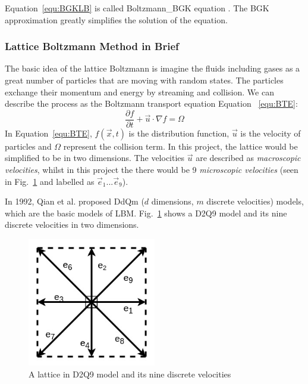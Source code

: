 Equation~\ref{equ:BGKLB} is called Boltzmann\_BGK equation \cite{chew1956boltzmann}. The BGK approximation greatly simplifies the solution of the equation.

\subsubsection{Lattice Boltzmann Method in Brief} \label{sec:lbmb}
The basic idea of the lattice Boltzmann is imagine the fluids including gases as a great number of particles that are moving with random states. The particles exchange their momentum and energy by streaming and collision. We can describe the process as the Boltzmann transport equation Equation ~\ref{equ:BTE}:
\begin{equation}
\label{equ:BTE}
    \frac{\partial f}{\partial t} + \vec{u}\cdot \nabla f = \Omega
\end{equation}
In Equation~\ref{equ:BTE}, $f(\vec{x}, t)$ is the distribution function, $\vec{u}$ is the velocity of particles and $\Omega$ represent the collision term. In this project, the lattice would be simplified to be in two dimensions. The velocities $\vec{u}$ are described as \textit{macroscopic velocities}, whilst in this project the there would be 9 \textit{microscopic velocities} (seen in Fig.~\ref{fig:d2q9} and labelled as $\vec{e}_1...\vec{e}_9$). 

In 1992, Qian et al. \cite{d2q9} proposed DdQm ($d$ dimensions, $m$ discrete velocities) models, which are the basic models of LBM. Fig.~\ref{fig:d2q9} shows a D2Q9 model and its nine discrete velocities in two dimensions.



\begin{figure}[!tb]
   \centering
       \includegraphics[width=0.5\textwidth]{figures/nine_direction.jpg}
       \caption{A lattice in D2Q9 model and its nine discrete velocities}
       \label{fig:d2q9}
\end{figure}

